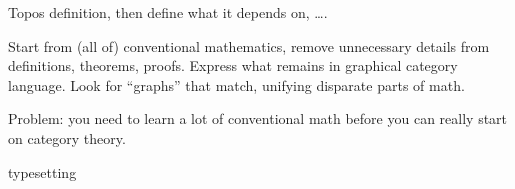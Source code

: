 \documentclass[11pt,openany]{article}
\def \texFolder {../../tex/}
\begin{document}
Topos definition, then define what it depends on, \ldots.
 
\setcounter{currentlevel}{\value{baseSectionLevel}}
\label{sec:Fusion}

Start from (all of) conventional mathematics,
remove unnecessary details from definitions, theorems, proofs.
Express what remains in graphical category language.
Look for ``graphs'' that match, unifying disparate parts of math.

Problem: you need to learn a lot of conventional math before
you can really start on category theory.

 
\pagebreak
\appendix
{typesetting}


%
\printbibliography[heading=bibintoc, title={References}]
\end{document}
